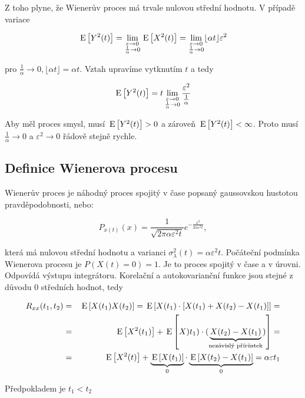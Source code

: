Z toho plyne, že Wienerův proces má trvale nulovou střední hodnotu. V případě variace

\[ \,\mathrm{E}\left[Y^2(t)\right] = \lim_{\substack{\varepsilon\to 0\\ \frac{1}{\alpha}\to 0}} \,\mathrm{E}\left[X^2(t)\right]=\lim_{\substack{\varepsilon\to 0\\ \frac{1}{\alpha}\to 0}} \lfloor\alpha t\rfloor \varepsilon^2 \]

pro $\frac{1}{\alpha}\to 0, \lfloor\alpha t\rfloor=\alpha t$. Vztah upravíme vytknutím $t$ a tedy

\[ \,\mathrm{E}\left[Y^2(t)\right] = t \lim_{\substack{\varepsilon\to 0\\ \frac{1}{\alpha}\to 0}} \frac{\varepsilon^2}{\frac{1}{\alpha}} \]

Aby měl proces smysl, musí $\,\mathrm{E}\left[Y^2(t)\right]>0$ a zároveň $\,\mathrm{E}\left[Y^2(t)\right]<\infty$. Proto musí $\frac{1}{\alpha}\to 0$ a $\varepsilon^2\to 0$ řádově stejně rychle.

\subsection{Definice Wienerova procesu}
Wienerův proces je náhodný proces spojitý v čase popsaný gaussovskou hustotou pravděpodobnosti, nebo:

\[ P_{x(t)}(x)=\frac{1}{\sqrt{2\pi\alpha\varepsilon^2 t}}e^{-\frac{x^2}{2\alpha\varepsilon^2 t}}, \]

která má nulovou střední hodnotu a varianci $\sigma^2_\lambda(t) = \alpha\varepsilon^2 t$. Počáteční podmínka Wienerova procesu je $P(X(t)=0)=1$. Je to proces spojitý v čase a v úrovni. Odpovídá výstupu integrátoru. Korelační a autokovarianční funkce jsou stejné z důvodu 0 středních hodnot, tedy

\begin{eqnarray*}
R_{xx}(t_1,t_2) &=&\,\mathrm{E}\left[X(t_1)X(t_2)\right] = \,\mathrm{E}\left[X(t_1)\cdot[X(t_1)+X(t_2)-X(t_1)]\right] = \\
& = & \,\mathrm{E}\left[X^2(t_1)\right] + \,\mathrm{E}\left[X)t_1)\cdot(\underbrace{X(t_2)-X(t_1)}_{\text{nezávislý přírůstek}})\right]= \\
& = & \,\mathrm{E}\left[X^2(t)\right]+\underbrace{\,\mathrm{E}\left[X(t_1)\right]}_0\cdot \underbrace{\,\mathrm{E}\left[X(t_2)-X(t_1)\right]}_0 = \alpha\varepsilon t_1
\end{eqnarray*}

Předpokladem je $t_1<t_2$